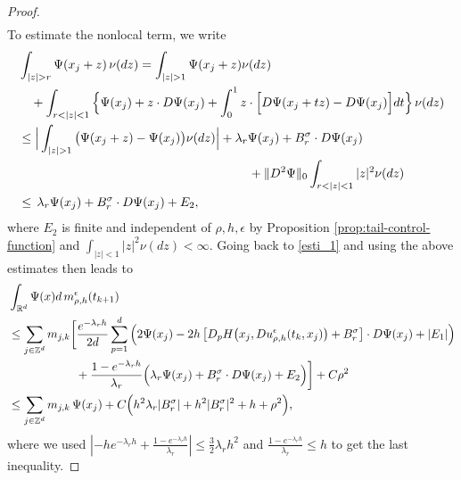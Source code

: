 \documentclass[a4paper,  twoside, 10pt, leqno]{amsart}
\newcommand{\Z}{\mathbb{Z}}
\newcommand{\R}{\mathbb{R}}
\theoremstyle{remark}
\theoremstyle{definition}
\begin{document}
\begin{proof}
\begin{align*}
\end{align*}
To estimate the nonlocal term, we write
\begin{align*}%
\notag &  \int_{|z|>r} \Psi(x_j+z) \, \nu(dz)  =   \int_{|z|>1} \Psi(x_j+z) \nu(dz)\\
&\quad +  \int_{r<|z|<1} \Big\{\Psi(x_j) + z\cdot D\Psi(x_j) 
 + \int_0^1  z \cdot \Big[ D \Psi(x_j+tz) - D \Psi(x_j)\Big]dt \Big\} \, \nu(dz)  \\ 
\notag & \leq \Big| \int_{|z|>1} \big(\Psi(x_j+z) - \Psi(x_j) \big) \nu(dz)\Big|  + \lambda_r \Psi(x_j) + B_r^{\sigma} \cdot D\Psi(x_j) \\ 
\notag &  \hspace*{6.5cm} + \|D^2\Psi\|_{0} \int_{r<|z|<1} |z|^2 \nu(dz) \\
& \leq \,  \lambda_r \Psi(x_j) + B_r^{\sigma} \cdot D\Psi(x_j) + E_2,
\end{align*}
where $E_2$ is finite and independent of $\rho, h,\epsilon$ by Proposition \ref{prop:tail-control-function} and $\int_{|z|<1} |z|^2 \nu(dz)<\infty$.
Going back to \eqref{esti_1} and using the above estimates then leads to
\begin{align*}
& \int_{\R^d} \Psi(x) d\,m^{\epsilon}_{\rho,h}(t_{k+1}) \\
& \leq  \sum_{j \in \Z^d} m_{j,k} \bigg[ \frac{e^{-\lambda_r h}}{2d} \sum_{p=1}^d\Big( \notag 2 \Psi(x_j) - 
2 h\,\big[ D_p H \big(x_j, Du^{\epsilon}_{\rho,h}(t_k,x_j)\big) + B_r^{\sigma}\big] \cdot D\Psi(x_j) + |E_1| \Big) \\
&  \hspace{2cm} + \frac{1-e^{-\lambda_r h}}{\lambda_r} \Big(\lambda_r \Psi(x_j)  + B_r^{\sigma} \cdot  D\Psi(x_j) + E_2 \Big) \bigg] + C   \rho^2  \\
& \leq   \sum_{j\in \Z^d} m_{j,k}\, \Psi(x_j)  +C \Big( h^2 \lambda_r |B_r^{\sigma}| + h^2 |B_r^{\sigma}|^2+ h + \rho^{2}\Big), 
\end{align*}
where we used 
$|-he^{-\lambda_rh} +\frac{1-e^{-\lambda_r h}}{\lambda_r}|\leq \frac{3}{2} \lambda_r h^2$ and $\frac{1-e^{-\lambda_r h}}{\lambda_r}\leq h$ to get the last inequality. 


\end{proof}
\end{document}
